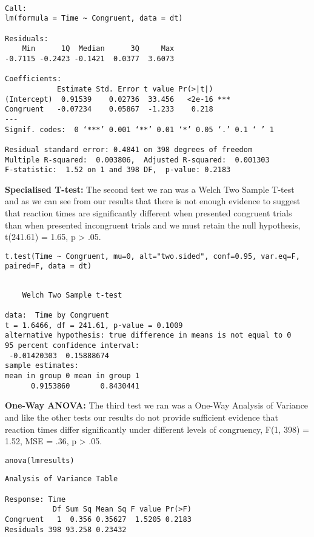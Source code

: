 \documentclass{article}
\begin{document}
\begin{verbatim}

Call:
lm(formula = Time ~ Congruent, data = dt)

Residuals:
    Min      1Q  Median      3Q     Max 
-0.7115 -0.2423 -0.1421  0.0377  3.6073 

Coefficients:
            Estimate Std. Error t value Pr(>|t|)    
(Intercept)  0.91539    0.02736  33.456   <2e-16 ***
Congruent   -0.07234    0.05867  -1.233    0.218    
---
Signif. codes:  0 ‘***’ 0.001 ‘**’ 0.01 ‘*’ 0.05 ‘.’ 0.1 ‘ ’ 1

Residual standard error: 0.4841 on 398 degrees of freedom
Multiple R-squared:  0.003806,	Adjusted R-squared:  0.001303 
F-statistic:  1.52 on 1 and 398 DF,  p-value: 0.2183
\end{verbatim}

\vspace{2em} \textbf{Specialised T-test:} The second test we ran was a Welch Two Sample T-test and as we can see from our results that there is not enough evidence to suggest that reaction times are significantly different when presented congruent trials than when presented incongruent trials and we must retain the null hypothesis, t(241.61) = 1.65, p > .05.
\begin{verbatim}
t.test(Time ~ Congruent, mu=0, alt="two.sided", conf=0.95, var.eq=F, paired=F, data = dt)
\end{verbatim}

\begin{verbatim}

	Welch Two Sample t-test

data:  Time by Congruent
t = 1.6466, df = 241.61, p-value = 0.1009
alternative hypothesis: true difference in means is not equal to 0
95 percent confidence interval:
 -0.01420303  0.15888674
sample estimates:
mean in group 0 mean in group 1 
      0.9153860       0.8430441
\end{verbatim}

\vspace{2em} \textbf{One-Way ANOVA:} The third test we ran was a One-Way Analysis of Variance and like the other tests our results do not provide sufficient evidence that reaction times differ significantly under different levels of congruency, F(1, 398) = 1.52, MSE = .36, p > .05.
\begin{verbatim}
anova(lmresults)
\end{verbatim}

\begin{verbatim}
Analysis of Variance Table

Response: Time
           Df Sum Sq Mean Sq F value Pr(>F)
Congruent   1  0.356 0.35627  1.5205 0.2183
Residuals 398 93.258 0.23432
\end{verbatim}
\end{document}
